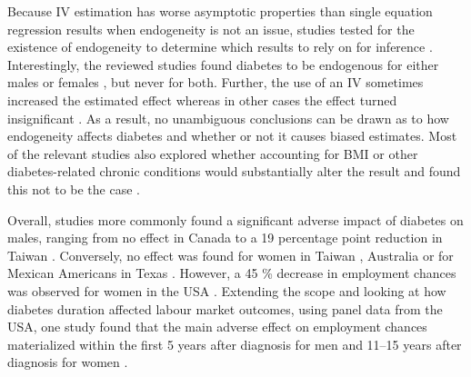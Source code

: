 \documentclass[12pt,english]{article}
\begin{document}
Because \ac{IV} estimation has worse asymptotic properties than single equation regression results when endogeneity is not an issue, studies tested for the existence of endogeneity to determine which results to rely on for inference \parencite{Brown2005d,Minor2011a,Latif2009b,Lin2011b}. Interestingly, the reviewed studies found diabetes to be endogenous for either males \parencite{Latif2009b} or females \parencite{Brown2005d,Minor2011a}, but never for both. Further, the use of an \ac{IV} sometimes increased the estimated effect\parencite{Minor2011a,Lin2011b} whereas in other cases the effect turned insignificant \parencite{Brown2005d,Latif2009b}. As a result, no unambiguous conclusions can be drawn as to how endogeneity affects diabetes and whether or not it causes biased estimates. Most of the relevant studies also explored whether accounting for \ac{BMI} or other diabetes-related chronic conditions would substantially alter the result and found this not to be the case \parencite{Brown2005d,Latif2009b,Minor2013}.

Overall, studies more commonly found a significant adverse impact of diabetes on males, ranging from no effect in Canada \parencite{Latif2009b} to a 19 percentage point reduction in Taiwan \parencite{Lin2011b}. Conversely, no effect was found for women in Taiwan  \parencite{Lin2011b}, Australia  \parencite{Zhang2009k} or for Mexican Americans in Texas \parencite{Brown2005d}. However, a 45 \% decrease in employment chances was observed for women in the USA \parencite{Minor2011a}. Extending the scope and looking at how diabetes duration affected labour market outcomes, using panel data from the USA, one study found that the main adverse effect on employment chances materialized within the first 5 years after diagnosis for men and 11--15 years after diagnosis for women \parencite{Minor2013}.
\end{document}
